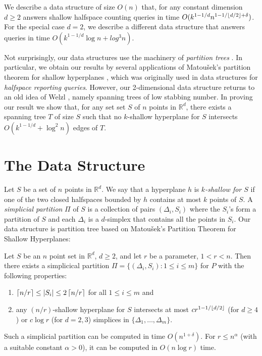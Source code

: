 \documentclass[lotsofwhite]{patmorin}
\newcommand{\X}{1-1/\floor{d/2}+\delta}
\begin{document}
We describe a data structure of size $O(n)$ that, for any constant
dimension $d\ge 2$ answers shallow halfspace counting queries in time
$O(k^{1-1/d}n^{\X})$.  For the special case $d=2$, we describe a
different data structure that answers queries in time $O(k^{1-1/d}\log
n + log^3 n)$. 

Not surprisingly, our data structures use the machinery of
\emph{partition trees} \cite{many-matouseks,welzl}.  In particular, we
obtain our results by several applications of Matou\v{s}ek's partition
theorem for shallow hyperplanes \cite{matousek-shallow}, which was
originally used in data structures for \emph{halfspace reporting
queries}.   However, our 2-dimensional data structure returns to an
old idea of Welzl \cite{welzl-partition-trees}, namely spanning trees
of low stabbing number.  In proving our result we show that, for any
set set $S$ of $n$ points in $\mathbb{R}^d$, there exists a spanning
tree $T$ of size $S$ such that no $k$-shallow hyperplane for $S$
intersects $O(k^{1-1/d} + \log^2 n)$ edges of $T$.


\section{The Data Structure}


Let $S$ be a set of $n$ points in $\mathbb{R}^d$.  We say that a
hyperplane $h$ is \emph{$k$-shallow for $S$} if one of the two closed
halfspaces bounded by $h$ contains at most $k$ points of $S$.   A
\emph{simplicial partition} $\Pi$ of $S$ is a collection of pairs
$(\Delta_i,S_i)$ where the $S_i$'s form a partition of $S$ and each
$\Delta_i$ is a $d$-simplex that contains all the points in $S_i$.
Our data structure is partition tree based on Matou\v{s}ek's Partition
Theorem for Shallow Hyperplanes:

\begin{thm}[Matou\v{s}ek 1992]
Let $S$ be an $n$ point set in $\mathbb{R}^d$, $d\ge 2$, and let $r$
be a parameter, $1<r<n$.  Then there exists a simplicical partition
$\Pi=\{(\Delta_i,S_i):1\le i\le m\}$ for $P$ with the following
properties:
\begin{enumerate}
\item $\left\lceil n/r \right\rceil\le |S_i|\le 2\left\lceil n/r \right\rceil$ for all $1\le i\le m$ and 

\item any $(n/r)$-shallow hyperplane for $S$ intersects at most
$cr^{1-1/\left\lfloor d/2 \right\rfloor}$ (for $d\ge 4$) or $c\log r$ (for
$d=2,3$) simplices in $\{\Delta_1,\ldots,\Delta_m\}$.
\end{enumerate}
Such a simplicial partition can be computed in time $O(n^{1+\delta})$.
For $r\le n^\alpha$ (with a suitable constant $\alpha > 0$), it can be
computed in $O(n\log r)$ time.
\end{thm}
\end{document}
